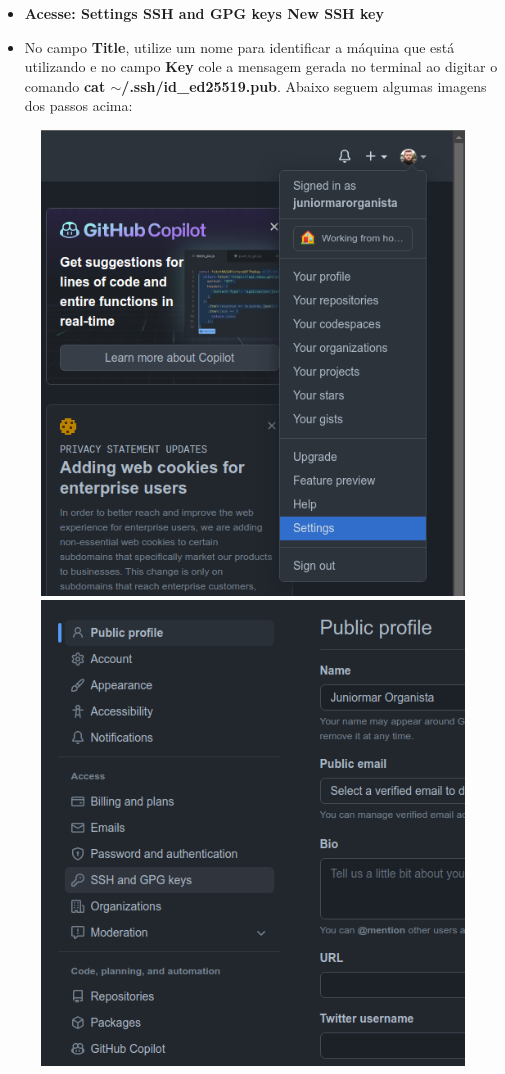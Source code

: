 \documentclass[12pt]{article}
\begin{document}
\begin{itemize}
	\item \textbf{Acesse: Settings \textrightarrow\quad SSH and GPG keys \textrightarrow\quad New SSH key }
	\item No campo \textbf{Title}, utilize um nome para identificar a máquina que está utilizando e no campo \textbf{Key} cole a mensagem gerada no terminal ao digitar o comando \textbf{cat $\sim$/.ssh/id\_ed25519.pub}. Abaixo seguem algumas imagens dos passos acima:
\end{itemize}
\newpage
\begin{figure}[htb]
	\centering
	\includegraphics[width=0.4\linewidth]{figures/ssh_1}
	\includegraphics[width=0.4\linewidth]{figures/ssh_2}
\end{figure}
\end{document}
